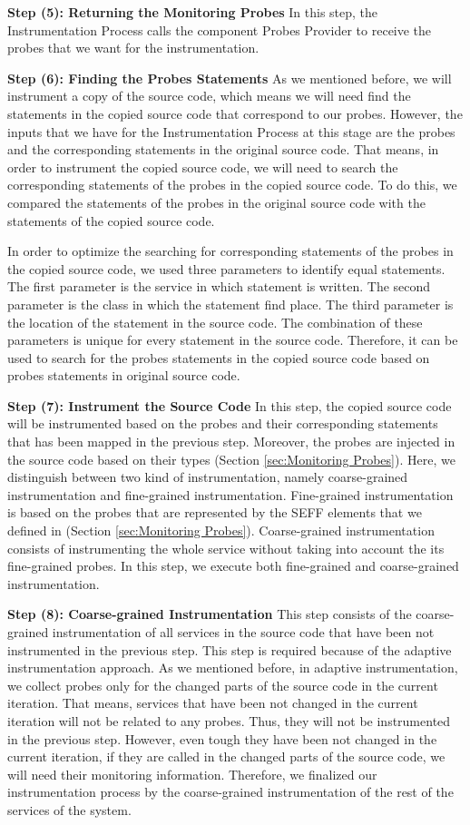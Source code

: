 \textbf{Step (5): Returning the Monitoring Probes}
In this step, the Instrumentation Process calls the component Probes Provider to receive the probes that we want for the instrumentation.

\textbf{Step (6): Finding the Probes Statements}
As we mentioned before, we will instrument a copy of the source code, which means we will need find the statements in the copied source code that correspond to our probes. However, the inputs that we have for the Instrumentation Process at this stage are the probes and the corresponding statements in the original source code. That means, in order to instrument the copied source code, we will need to search the corresponding statements of the probes in the copied source code. To do this, we compared the statements of the probes in the original source code with the statements of the copied source code. 

In order to optimize the searching for corresponding statements of the probes in the copied source code, we used three parameters to identify equal statements. The first parameter is the service in which statement is written. The second parameter is the class in which the statement find place. The third parameter is the location of the statement in the source code. The combination of these parameters is unique for every statement in the source code. Therefore, it can be used to search for the probes statements in the copied source code based on probes statements in original source code. 

\textbf{Step (7): Instrument the Source Code}
In this step, the copied source code will be instrumented based on the probes and their corresponding statements that has been mapped in the previous step. Moreover, the probes are injected in the source code based on their types (Section \ref{sec:Monitoring Probes}).  Here, we distinguish between two kind of instrumentation, namely coarse-grained instrumentation and fine-grained instrumentation. Fine-grained instrumentation is based on the probes that are represented by the SEFF elements that we defined in (Section \ref{sec:Monitoring Probes}). Coarse-grained instrumentation consists of instrumenting the whole service without taking into account the its fine-grained probes. In this step, we execute both fine-grained and coarse-grained instrumentation. 

\textbf{Step (8): Coarse-grained Instrumentation}
This step consists of the coarse-grained instrumentation of all services in the source code that have been not instrumented in the previous step.  This step is required because of the adaptive instrumentation approach. As we mentioned before, in adaptive instrumentation, we collect probes only for the changed parts of the source code in the current iteration. That means, services that have been not changed in the current iteration will not be related to any probes. Thus, they will not be instrumented in the previous step. However, even tough they have been not changed in the current iteration, if they are called in the changed parts of the source code, we will need their monitoring information. Therefore, we finalized our instrumentation process by the coarse-grained instrumentation of the rest of the services of the system.  

